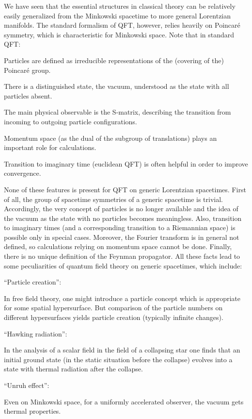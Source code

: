 \documentclass[11pt]{article}
\newcommand{\1}{\mathds{1}}                         %
\begin{document}
We have seen that the essential structures in classical theory can be relatively easily generalized from the Minkowski spacetime to more general Lorentzian manifolds. The standard formalism of QFT, however, relies heavily on Poincar\'{e} symmetry, which is characteristic for Minkowski space. Note that in standard QFT:
\begin{itemize}

{\item Particles are defined as irreducible representations of the (covering of the) Poincar\'{e} group.}

{\item There is a distinguished state, the vacuum, understood as the state with all particles absent.}

{\item The main physical observable is the S-matrix, describing the transition from incoming to outgoing particle configurations.}

{\item  Momentum space (as the dual of the subgroup of translations) plays an important role for calculations.}

{\item Transition to imaginary time (euclidean QFT) is often helpful in order to improve convergence. }
\end{itemize}



None of these features is present for QFT on generic Lorentzian spacetimes. First of all, the group of spacetime symmetries of a generic spacetime is trivial. Accordingly, the very concept of particles is no longer available and the idea of the vacuum as the state with no particles becomes meaningless. Also,  transition to imaginary times (and a corresponding transition to a Riemannian space) is possible only in special cases. Moreover, the Fourier transform is in general not defined, so calculations relying on momentum space cannot be done. Finally, there is no unique definition of the Feynman propagator. All these facts lead to  some peculiarities of quantum field theory on generic spacetimes, which include:
\begin{itemize}

{\item ``Particle creation'':} 

{In free field theory, one might introduce a particle concept which is appropriate for some spatial hypersurface.} 
{But comparison of the particle numbers on different hypersurfaces yields particle creation
(typically infinite changes).}

{\item ``Hawking radiation'':} 

{In the analysis of a scalar field in the field of a collapsing star one finds that an initial ground state (in the static situation before the collapse) evolves into a state with thermal radiation after the collapse.}

{\item ``Unruh effect'': }

{Even on Minkowski space, for a uniformly accelerated observer, the vacuum gets thermal properties.}
\end{itemize}
\end{document}
